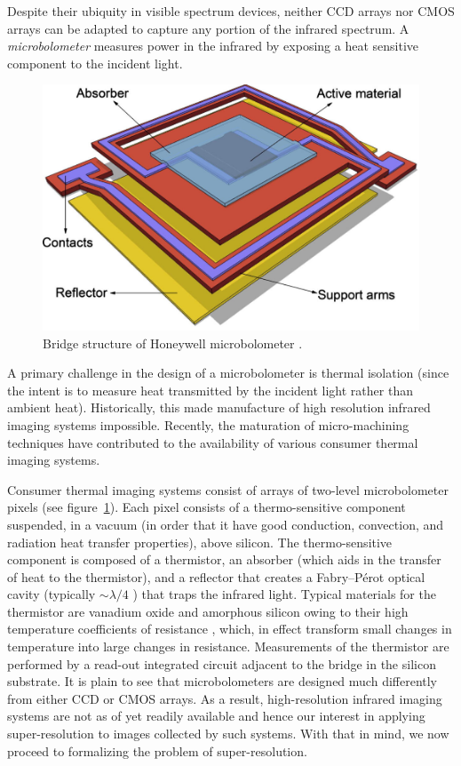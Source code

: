 Despite their ubiquity in visible spectrum devices, neither CCD arrays nor CMOS arrays can be adapted to capture any portion of the infrared spectrum.
%
A \textit{microbolometer} measures power in the infrared by exposing a heat sensitive component to the incident light.
%
\begin{figure}[!htbp]
	\center
	\includegraphics[width=\linewidth,keepaspectratio]{figures/background/microbolometer2.png}
	\caption{Bridge structure of Honeywell microbolometer \cite{KESIM2014245}.}
	\label{fig:microbolometer}
\end{figure}
%
A primary challenge in the design of a microbolometer is thermal isolation (since the intent is to measure heat transmitted by the incident light rather than ambient heat).
%
Historically, this made manufacture of high resolution infrared imaging systems impossible.
%
Recently, the maturation of micro-machining techniques have contributed to the availability of various consumer thermal imaging systems.

Consumer thermal imaging systems consist of arrays of two-level microbolometer pixels (see figure~\ref{fig:microbolometer}). 
%
Each pixel consists of a thermo-sensitive component suspended, in a vacuum (in order that it have good conduction, convection, and radiation heat transfer properties), above silicon.
%
The thermo-sensitive component is composed of a thermistor, an absorber (which aids in the transfer of heat to the thermistor), and a reflector that creates a Fabry–Pérot optical cavity (typically \({\sim}\lambda/4\) \cite{bolometer}) that traps the infrared light.
%
Typical materials for the thermistor are vanadium oxide and amorphous silicon owing to their high temperature coefficients of resistance \cite{bolometer}, which, in effect transform small changes in temperature into large changes in resistance.
%
Measurements of the thermistor are performed by a read-out integrated circuit adjacent to the bridge in the silicon substrate.
%
It is plain to see that microbolometers are designed much differently from either CCD or CMOS arrays.
%
As a result, high-resolution infrared imaging systems are not as of yet readily available and hence our interest in applying super-resolution to images collected by such systems.
%
With that in mind, we now proceed to formalizing the problem of super-resolution.

